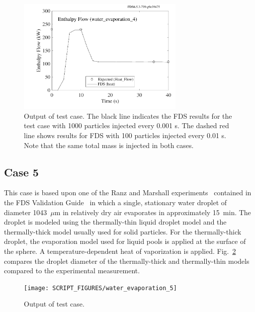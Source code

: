 \documentclass[11pt]{book}
\begin{document}
\begin{figure}[h!]
\centering
\includegraphics[height=2.2in]{SCRIPT_FIGURES/water_evaporation_4_enthalpy}
\caption[Sample case ]{Output of  test case.  The black line indicates the FDS results for the test case with 1000 particles injected every 0.001 s.  The dashed red line shows results for FDS with 100 particles injected every 0.01 s.  Note that the same total mass is injected in both cases.}
\label{water_evaporation_4_plot}
\end{figure}

\FloatBarrier

\subsection{Case 5}
\label{water_evaporation_5}

This case is based upon one of the Ranz and Marshall experiments~\cite{Ranz} contained in the FDS Validation Guide~\cite{FDS_Validation_Guide} in which a single, stationary water droplet of diameter 1043~$\mu$m in relatively dry air evaporates in approximately 15~min. The droplet is modeled using the thermally-thin liquid droplet model and the thermally-thick model usually used for solid particles. For the thermally-thick droplet, the evaporation model used for liquid pools is applied at the surface of the sphere. A temperature-dependent heat of vaporization is applied. Fig.~\ref{water_evaporation_5_plot} compares the droplet diameter of the thermally-thick and thermally-thin models compared to the experimental measurement.

\begin{figure}[h!]
\centering
\texttt{[image: SCRIPT\_FIGURES/water\_evaporation\_5]}
\caption[Sample case ]{Output of  test case.}
\label{water_evaporation_5_plot}
\end{figure}
\end{document}
